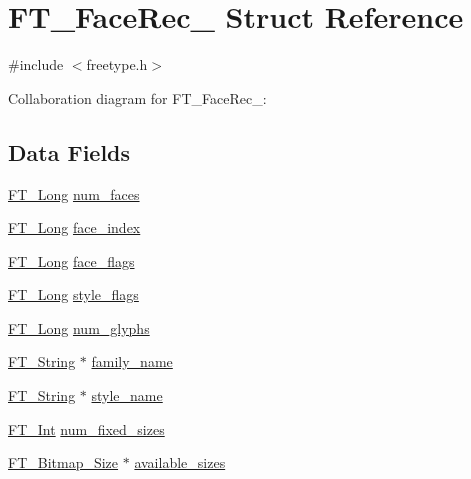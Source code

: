 \hypertarget{struct_f_t___face_rec__}{}\section{F\+T\+\_\+\+Face\+Rec\+\_\+ Struct Reference}
\label{struct_f_t___face_rec__}


{\ttfamily \#include $<$freetype.\+h$>$}



Collaboration diagram for F\+T\+\_\+\+Face\+Rec\+\_\+\+:
\subsection*{Data Fields}
\begin{DoxyCompactItemize}
\item 
\hyperlink{fttypes_8h_a7fa72a1f0e79fb1860c5965789024d6f}{F\+T\+\_\+\+Long} \hyperlink{struct_f_t___face_rec___af28be4cba102baaeb09d8e24b71e88fe}{num\+\_\+faces}
\item 
\hyperlink{fttypes_8h_a7fa72a1f0e79fb1860c5965789024d6f}{F\+T\+\_\+\+Long} \hyperlink{struct_f_t___face_rec___ab9a5640eb25bd3c743b3d725edd68a87}{face\+\_\+index}
\item 
\hyperlink{fttypes_8h_a7fa72a1f0e79fb1860c5965789024d6f}{F\+T\+\_\+\+Long} \hyperlink{struct_f_t___face_rec___af1596857ebc9f8eac4c4b51c8f3ffd31}{face\+\_\+flags}
\item 
\hyperlink{fttypes_8h_a7fa72a1f0e79fb1860c5965789024d6f}{F\+T\+\_\+\+Long} \hyperlink{struct_f_t___face_rec___ab06fc56f19fc1bf51cbed9bd621d3835}{style\+\_\+flags}
\item 
\hyperlink{fttypes_8h_a7fa72a1f0e79fb1860c5965789024d6f}{F\+T\+\_\+\+Long} \hyperlink{struct_f_t___face_rec___a58348bc3e0e113e8c73de9c318a9bd7a}{num\+\_\+glyphs}
\item 
\hyperlink{fttypes_8h_a9846214585359eb2ba6bbb0e6de30639}{F\+T\+\_\+\+String} $\ast$ \hyperlink{struct_f_t___face_rec___ae07b64a64466aa7ae2b9066e9336ac8b}{family\+\_\+name}
\item 
\hyperlink{fttypes_8h_a9846214585359eb2ba6bbb0e6de30639}{F\+T\+\_\+\+String} $\ast$ \hyperlink{struct_f_t___face_rec___abd855b9e48b1f377b22176fb97668d7b}{style\+\_\+name}
\item 
\hyperlink{fttypes_8h_af90e5fb0d07e21be9fe6faa33f02484c}{F\+T\+\_\+\+Int} \hyperlink{struct_f_t___face_rec___aa652af958546eb8edf87ccd4b697bfdf}{num\+\_\+fixed\+\_\+sizes}
\item 
\hyperlink{freetype_8h_a6905fdea05db62fabe3ed448cbf6778b}{F\+T\+\_\+\+Bitmap\+\_\+\+Size} $\ast$ \hyperlink{struct_f_t___face_rec___a563ca9007f754aa0f711ba67050f3e47}{available\+\_\+sizes}

\end{DoxyCompactItemize}
